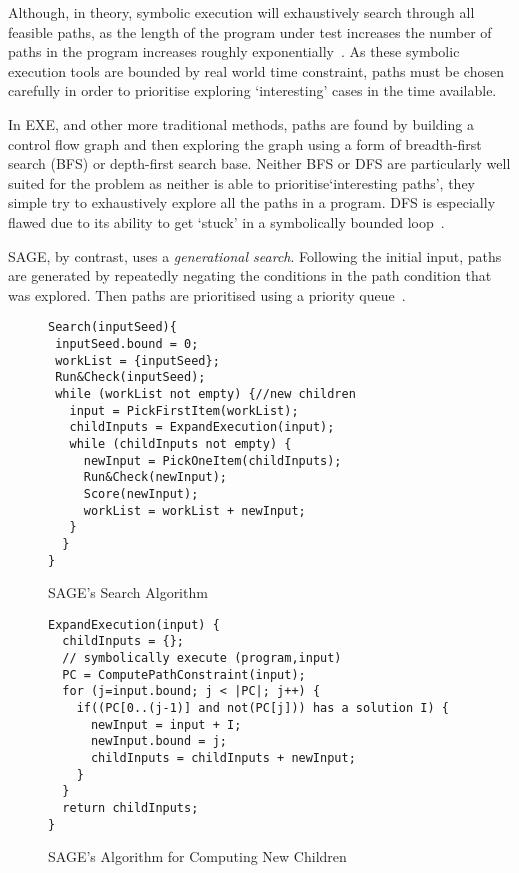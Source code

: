 \documentclass[]{final_report}
\begin{document}
Although, in theory, symbolic execution will exhaustively search through all feasible paths, as the length of the program under test increases the number of paths in the program increases roughly exponentially~\cite{cadar2013symbolic}. As these symbolic execution tools are bounded by real world time constraint, paths must be chosen carefully in order to prioritise exploring `interesting' cases in the time available.

In EXE, and other more traditional methods, paths are found by building a control flow graph and then exploring the graph using a form of breadth-first search (BFS) or depth-first search base. Neither BFS or DFS are particularly well suited for the problem as neither is able to prioritise`interesting paths', they simple try to exhaustively explore all the paths in a program. DFS is especially flawed due to its ability to get `stuck' in a symbolically bounded loop~\cite{cadar2008exe}. 

SAGE, by contrast, uses a \textit{generational search}. Following the initial input, paths are generated by repeatedly negating the conditions in the path condition that was explored. Then paths are prioritised using a priority queue~\cite{godefroid2005dart}.

\begin{figure}[h]
\begin{lstlisting}
Search(inputSeed){
 inputSeed.bound = 0;
 workList = {inputSeed};
 Run&Check(inputSeed);
 while (workList not empty) {//new children
   input = PickFirstItem(workList);
   childInputs = ExpandExecution(input);
   while (childInputs not empty) {
     newInput = PickOneItem(childInputs);
     Run&Check(newInput);
     Score(newInput);
     workList = workList + newInput;
   }
  }
}
\end{lstlisting}
\caption{\label{fig:sage-search} SAGE's Search Algorithm}
\end{figure}

\begin{figure}[h]
\begin{lstlisting}
ExpandExecution(input) {
  childInputs = {};
  // symbolically execute (program,input)
  PC = ComputePathConstraint(input);
  for (j=input.bound; j < |PC|; j++) {
    if((PC[0..(j-1)] and not(PC[j])) has a solution I) {
      newInput = input + I;
      newInput.bound = j;
      childInputs = childInputs + newInput;
    }
  }
  return childInputs;
}

\end{lstlisting}
\caption{\label{fig:sage-compute-new-children} SAGE's Algorithm for Computing New Children}
\end{figure}
\end{document}
